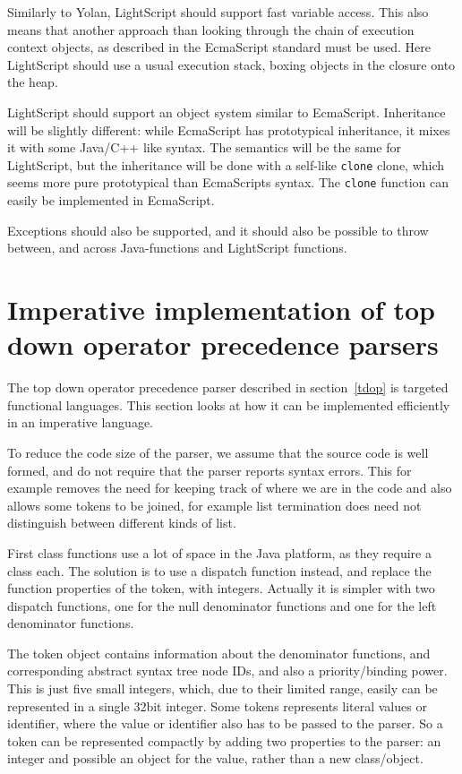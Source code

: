 \documentclass[11pt]{report}
\begin{document}
Similarly to Yolan, LightScript should support fast variable access. This also means that another approach than looking through the chain of execution context objects, as described in the EcmaScript standard must be used. Here LightScript should use a usual execution stack, boxing objects in the closure onto the heap.

LightScript should support an object system similar to EcmaScript.
Inheritance will be slightly different: while EcmaScript has prototypical inheritance, it mixes it with some Java/C++ like syntax. The semantics will be the same for LightScript, but the inheritance will be done with a self-like \verb|clone| clone, which seems more pure prototypical than EcmaScripts syntax. The \verb|clone| function can easily be implemented in EcmaScript.

Exceptions should also be supported, and it should also be possible to throw between, and across Java-functions and LightScript functions.

\section{Imperative implementation of top down operator precedence parsers}
The top down operator precedence parser described in section~\ref{tdop} is targeted functional languages.
This section looks at how it can be implemented efficiently in an imperative language.

To reduce the code size of the parser, we assume that the source code is well formed, and do not require that the parser reports syntax errors. This for example removes the need for keeping track of where we are in the code and also allows some tokens to be joined, for example list termination does need not distinguish between different kinds of list.

First class functions use a lot of space in the Java platform, as they require a class each.
The solution is to use a dispatch function instead, and replace the function properties of the token, with integers.
Actually it is simpler with two dispatch functions, one for the null denominator functions and one for the left denominator functions.

The token object contains information about the denominator functions, and corresponding abstract syntax tree node IDs, and also a priority/binding power.
This is just five small integers, which, due to their limited range, easily can be represented in a single 32bit integer. 
Some tokens represents literal values or identifier, where the value or identifier also has to be passed to the parser.
So a token can be represented compactly by adding two properties to the parser: an integer and possible an object for the value, rather than a new class/object.
\end{document}
